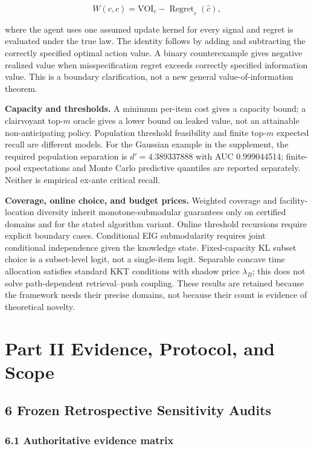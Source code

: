 \documentclass[
  11pt]{article}
\begin{document}
\[W(c,\hat c)=\mathrm{VOI}_c-\operatorname{Regret}_c(\hat c),\tag{7}\]

where the agent uses one assumed update kernel for every signal and
regret is evaluated under the true law. The identity follows by adding
and subtracting the correctly specified optimal action value. A binary
counterexample gives negative realized value when misspecification
regret exceeds correctly specified information value. This is a boundary
clarification, not a new general value-of-information theorem.

\textbf{Capacity and thresholds.} A minimum per-item cost gives a
capacity bound; a clairvoyant top-\(m\) oracle gives a lower bound on
leaked value, not an attainable non-anticipating policy. Population
threshold feasibility and finite top-\(m\) expected recall are different
models. For the Gaussian example in the supplement, the required
population separation is \(d'=4.389337888\) with AUC 0.999044514;
finite-pool expectations and Monte Carlo predictive quantiles are
reported separately. Neither is empirical ex-ante critical recall.

\textbf{Coverage, online choice, and budget prices.} Weighted coverage
and facility-location diversity inherit monotone-submodular guarantees
only on certified domains and for the stated algorithm variant. Online
threshold recursions require explicit boundary cases. Conditional EIG
submodularity requires joint conditional independence given the
knowledge state. Fixed-capacity KL subset choice is a subset-level
logit, not a single-item logit. Separable concave time allocation
satisfies standard KKT conditions with shadow price \(\lambda_B\); this
does not solve path-dependent retrieval--push coupling. These results
are retained because the framework needs their precise domains, not
because their count is evidence of theoretical novelty.

\section{Part II Evidence, Protocol, and
Scope}\label{part-ii-evidence-protocol-and-scope}

\subsection{6 Frozen Retrospective Sensitivity
Audits}\label{frozen-retrospective-sensitivity-audits}

\subsubsection{6.1 Authoritative evidence
matrix}\label{authoritative-evidence-matrix}
\end{document}
